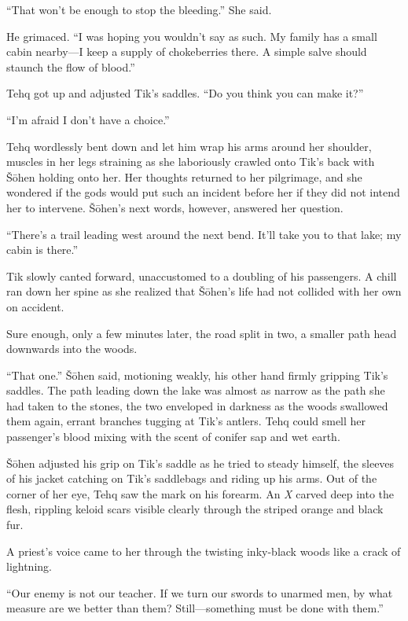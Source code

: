``That won't be enough to stop the bleeding.'' She said.

He grimaced. ``I was hoping you wouldn't say as such. My family has a small cabin nearby---I keep a supply of chokeberries there. A simple salve should staunch the flow of blood.''

Tehq got up and adjusted Tik's saddles. ``Do you think you can make it?''

``I'm afraid I don't have a choice.''

Tehq wordlessly bent down and let him wrap his arms around her shoulder, muscles in her legs straining as she laboriously crawled onto Tik's back with Šōhen holding onto her. Her thoughts returned to her pilgrimage, and she wondered if the gods would put such an incident before her if they did not intend her to intervene. Šōhen's next words, however, answered her question.

``There's a trail leading west around the next bend. It'll take you to that lake; my cabin is there.''

Tik slowly canted forward, unaccustomed to a doubling of his passengers. A chill ran down her spine as she realized that Šōhen's life had not collided with her own on accident.

Sure enough, only a few minutes later, the road split in two, a smaller path head downwards into the woods.

``That one.'' Šōhen said, motioning weakly, his other hand firmly gripping Tik's saddles. The path leading down the lake was almost as narrow as the path she had taken to the stones, the two enveloped in darkness as the woods swallowed them again, errant branches tugging at Tik's antlers. Tehq could smell her passenger's blood mixing with the scent of conifer sap and wet earth.

Šōhen adjusted his grip on Tik's saddle as he tried to steady himself, the sleeves of his jacket catching on Tik's saddlebags and riding up his arms. Out of the corner of her eye, Tehq saw the mark on his forearm. An \emph{X} carved deep into the flesh, rippling keloid scars visible clearly through the striped orange and black fur.

A priest's voice came to her through the twisting inky-black woods like a crack of lightning.

``Our enemy is not our teacher. If we turn our swords to unarmed men, by what measure are we better than them? Still---something must be done with them.''

